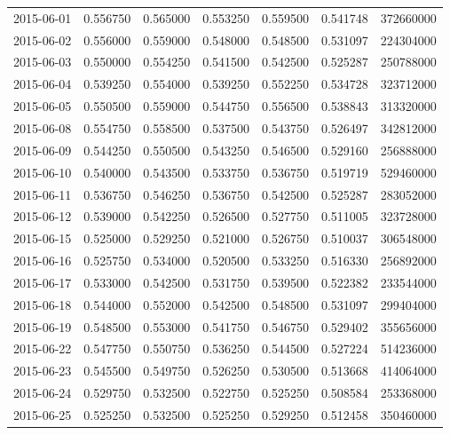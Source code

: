 \begin{tabular}{lrrrrrr}
2015-06-01 &    0.556750 &    0.565000 &    0.553250 &    0.559500 &    0.541748 &   372660000 \\
2015-06-02 &    0.556000 &    0.559000 &    0.548000 &    0.548500 &    0.531097 &   224304000 \\
2015-06-03 &    0.550000 &    0.554250 &    0.541500 &    0.542500 &    0.525287 &   250788000 \\
2015-06-04 &    0.539250 &    0.554000 &    0.539250 &    0.552250 &    0.534728 &   323712000 \\
2015-06-05 &    0.550500 &    0.559000 &    0.544750 &    0.556500 &    0.538843 &   313320000 \\
2015-06-08 &    0.554750 &    0.558500 &    0.537500 &    0.543750 &    0.526497 &   342812000 \\
2015-06-09 &    0.544250 &    0.550500 &    0.543250 &    0.546500 &    0.529160 &   256888000 \\
2015-06-10 &    0.540000 &    0.543500 &    0.533750 &    0.536750 &    0.519719 &   529460000 \\
2015-06-11 &    0.536750 &    0.546250 &    0.536750 &    0.542500 &    0.525287 &   283052000 \\
2015-06-12 &    0.539000 &    0.542250 &    0.526500 &    0.527750 &    0.511005 &   323728000 \\
2015-06-15 &    0.525000 &    0.529250 &    0.521000 &    0.526750 &    0.510037 &   306548000 \\
2015-06-16 &    0.525750 &    0.534000 &    0.520500 &    0.533250 &    0.516330 &   256892000 \\
2015-06-17 &    0.533000 &    0.542500 &    0.531750 &    0.539500 &    0.522382 &   233544000 \\
2015-06-18 &    0.544000 &    0.552000 &    0.542500 &    0.548500 &    0.531097 &   299404000 \\
2015-06-19 &    0.548500 &    0.553000 &    0.541750 &    0.546750 &    0.529402 &   355656000 \\
2015-06-22 &    0.547750 &    0.550750 &    0.536250 &    0.544500 &    0.527224 &   514236000 \\
2015-06-23 &    0.545500 &    0.549750 &    0.526250 &    0.530500 &    0.513668 &   414064000 \\
2015-06-24 &    0.529750 &    0.532500 &    0.522750 &    0.525250 &    0.508584 &   253368000 \\
2015-06-25 &    0.525250 &    0.532500 &    0.525250 &    0.529250 &    0.512458 &   350460000 \\

\end{tabular}
